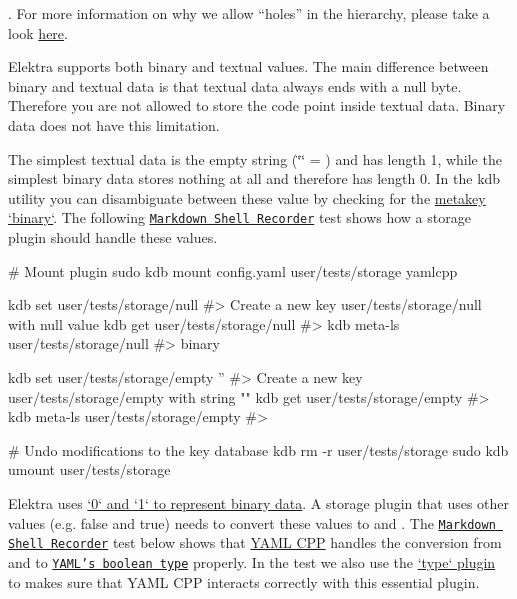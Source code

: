 . For more information on why we allow “holes” in the hierarchy, please take a look \hyperlink{doc_decisions_holes_md}{here}.

Elektra supports both binary and textual values. The main difference between binary and textual data is that textual data always ends with a null byte. Therefore you are not allowed to store the code point {} inside textual data. Binary data does not have this limitation.

The simplest textual data is the empty string ({\ttfamily \char`\"{}\char`\"{}} = {}) and has length 1, while the simplest binary data stores nothing at all and therefore has length 0. In the {\ttfamily kdb} utility you can disambiguate between these value by checking for the \hyperlink{doc_help_elektra-metadata_md}{metakey `binary`}. The following \href{https://master.libelektra.org/tests/shell/shell_recorder/tutorial_wrapper}{\tt Markdown Shell Recorder} test shows how a storage plugin should handle these values.


\begin{DoxyCode}
# Mount plugin
sudo kdb mount config.yaml user/tests/storage yamlcpp

kdb set user/tests/storage/null
#> Create a new key user/tests/storage/null with null value
kdb get user/tests/storage/null
#>
kdb meta-ls user/tests/storage/null
#> binary

kdb set user/tests/storage/empty ''
#> Create a new key user/tests/storage/empty with string ""
kdb get user/tests/storage/empty
#>
kdb meta-ls user/tests/storage/empty
#>

# Undo modifications to the key database
kdb rm -r user/tests/storage
sudo kdb umount user/tests/storage
\end{DoxyCode}


Elektra uses \hyperlink{doc_decisions_boolean_md}{`0` and `1` to represent binary data}. A storage plugin that uses other values (e.\+g. {\ttfamily false} and {\ttfamily true}) needs to convert these values to {} and {}. The \href{https://master.libelektra.org/tests/shell/shell_recorder/tutorial_wrapper}{\tt Markdown Shell Recorder} test below shows that \hyperlink{autotoc_md865_src_plugins_yamlcpp_README_md}{Y\+A\+ML C\+PP} handles the conversion from and to \href{https://yaml.org/spec/1.2/spec.html#id2803629}{\tt Y\+A\+M\+L’s boolean type} properly. In the test we also use the \hyperlink{autotoc_md803_src_plugins_type_README_md}{`type` plugin} to makes sure that Y\+A\+ML C\+PP interacts correctly with this essential plugin.


